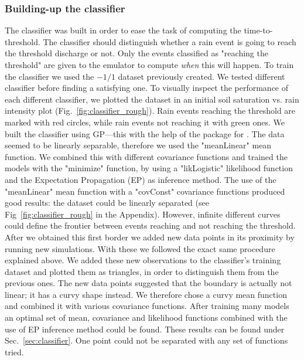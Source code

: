 \subsubsection{Building-up the classifier}
The classifier was built in order to ease the task of computing the time-to-threshold.
The classifier should distinguish whether a rain event is going to reach the threshold discharge or not.
Only the events classified as "reaching the threshold" are given to the emulator to compute \emph{when} this will happen.
To train the classifier we used the $\num{-1}/\num{1}$ dataset previously created.
We tested different classifier before finding a satisfying one.
To visually inspect the performance of each different classifier, we plotted the dataset in an initial soil saturation vs. rain intensity plot (Fig.~\ref{fig:classifier_rough}).
Rain events reaching the threshold are marked with red circles, while rain events not reaching it with green ones.
We built the classifier using GP---this with the help of the package  for .
The data seemed to be linearly separable, therefore we used the "meanLinear" mean function.
We combined this with different covariance functions and trained the models with the "minimize" function, by using a "likLogistic" likelihood function and the Expectation Propagation (EP) as inference method.
The use of the "meanLinear" mean function with a "covConst" covariance functions produced good results: the dataset could be linearly separated (see Fig~\ref{fig:classifier_rough} in the Appendix).
However, infinite different curves could define the frontier between events reaching and not reaching the threshold.
After we obtained this first border we added new data points in its proximity by running new simulations.
With these we followed the exact same procedure explained above.
We added these new observations to the classifier's training dataset and plotted them as triangles, in order to distinguish them from the previous ones.
The new data points suggested that the boundary is actually not linear; it has a curvy shape instead.
We therefore chose a curvy mean function and combined it with various covariance functions.
After training many models an optimal set of mean, covariance and likelihood functions combined with the use of EP inference method could be found. These results can be found under Sec.~\ref{sec:classifier}.
One point could not be separated with any set of functions tried.

